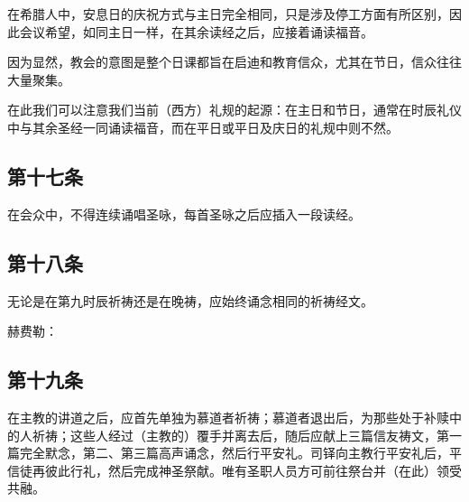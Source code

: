 在希腊人中，安息日的庆祝方式与主日完全相同，只是涉及停工方面有所区别，因此会议希望，如同主日一样，在其余读经之后，应接着诵读福音。\par

因为显然，教会的意图是整个日课都旨在启迪和教育信众，尤其在节日，信众往往大量聚集。\par

在此我们可以注意我们当前（西方）礼规的起源：在主日和节日，通常在时辰礼仪中与其余圣经一同诵读福音，而在平日或平日及庆日的礼规中则不然。\par


\subsection{第十七条}

在会众中，不得连续诵唱圣咏，每首圣咏之后应插入一段读经。\par


\subsection{第十八条}

无论是在第九时辰祈祷还是在晚祷，应始终诵念相同的祈祷经文。\par

赫费勒：\par


\subsection{第十九条}

在主教的讲道之后，应首先单独为慕道者祈祷；慕道者退出后，为那些处于补赎中的人祈祷；这些人经过（主教的）覆手并离去后，随后应献上三篇信友祷文，第一篇完全默念，第二、第三篇高声诵念，然后行平安礼。司铎向主教行平安礼后，平信徒再彼此行礼，然后完成神圣祭献。唯有圣职人员方可前往祭台并（在此）领受共融。\par

